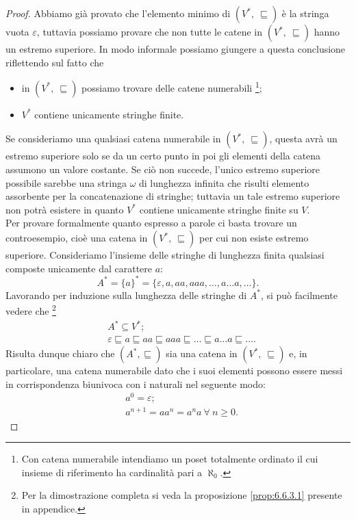 \begin{proof}
Abbiamo già provato che l'elemento minimo di $(V^*,\ \sqsubseteq )$ è la stringa vuota $\varepsilon$, tuttavia possiamo provare che non tutte le catene in $(V^*,\ \sqsubseteq )$ hanno un estremo superiore. In modo informale possiamo giungere a questa conclusione riflettendo sul fatto che 
\begin{itemize}
\item in $(V^*,\ \sqsubseteq )$ possiamo trovare delle catene numerabili \footnote{Con catena numerabile intendiamo un poset totalmente ordinato il cui insieme di riferimento ha cardinalità pari a $\aleph_0$.};
\item $V^*$ contiene unicamente stringhe finite.
\end{itemize}
Se consideriamo una qualsiasi catena numerabile in $(V^*,\ \sqsubseteq )$, questa avrà un estremo superiore solo se da un certo punto in poi gli elementi della catena assumono un valore costante. Se ciò non succede, l'unico estremo superiore possibile sarebbe una stringa  $\omega$ di lunghezza infinita che risulti elemento assorbente per la concatenazione di stringhe; tuttavia un tale estremo superiore non potrà esistere in quanto $V^*$ contiene unicamente stringhe finite su $V$.\\
Per provare formalmente quanto espresso a parole ci basta trovare un controesempio, cioè una catena in $(V^*,\ \sqsubseteq )$ per cui non esiste estremo superiore. Consideriamo l'insieme delle stringhe di lunghezza finita qualsiasi composte unicamente dal carattere $a$:\[
	A^* = \{a\}^* = \{\varepsilon, a, aa, aaa, \ldots, a \ldots a, \ldots \}.
\]
Lavorando per induzione sulla lunghezza delle stringhe di $A^*$, si può facilmente vedere che \footnote{Per la dimostrazione completa si veda la proposizione \ref{prop:6.6.3.1} presente in appendice.}
\begin{align*}
	& A^* \subseteq V^*; \\
	& \varepsilon \sqsubseteq a \sqsubseteq aa \sqsubseteq aaa \sqsubseteq \ldots 
		\sqsubseteq a \ldots a \sqsubseteq \ldots.
\end{align*}
Risulta dunque chiaro che $(A^*, \sqsubseteq)$ sia una catena in $(V^*,\ \sqsubseteq )$ e, in particolare, una catena numerabile dato che i suoi elementi possono essere messi in corrispondenza biunivoca con i naturali nel seguente modo:
\begin{align*}
	& a^0 = \varepsilon;\\
	& a^{n+1} = a a^n = a^n a \ \forall \ n \geq 0.
\end{align*}

\end{proof}
